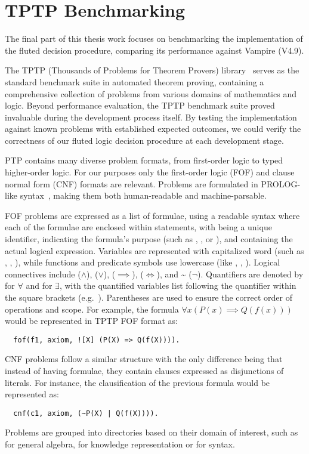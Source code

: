 \chapter{TPTP Benchmarking}\label{chap:tptp-benchmarking}

The final part of this thesis work focuses on benchmarking the implementation of the fluted decision procedure, comparing its performance against Vampire (V4.9).

The TPTP (Thousands of Problems for Theorem Provers) library~\cite{Sut17} serves as the standard benchmark suite in automated theorem proving, containing a comprehensive collection of problems from various domains of mathematics and logic.
Beyond performance evaluation, the TPTP benchmark suite proved invaluable during the development process itself. By testing the implementation against known problems with established expected outcomes, we could verify the correctness of our fluted logic decision procedure at each development stage.

PTP contains many diverse problem formats, from first-order logic to typed higher-order logic. For our purposes only the first-order logic (FOF) and clause normal form (CNF) formats are relevant.
Problems are formulated in PROLOG-like syntax~\cite{Sut22}, making them both human-readable and machine-parsable.

FOF problems are expressed as a list of formulae, using a readable syntax where each of the formulae are enclosed within  statements, with  being a unique identifier,  indicating the formula's purpose (such as , , or ), and  containing the actual logical expression. %
Variables are represented with capitalized word (such as , , ), while functions and predicate symbols use lowercase (like , , ).
Logical connectives include \code{\&} (\(\land\)), \code{|} (\(\lor\)), \code{=>} (\(\implies\)), \code{<=>} (\(\iff\)), and \textasciitilde{} (\(\neg\)).
Quantifiers are denoted by \code{!} for \(\forall\) and  for \(\exists\), with the quantified variables list following the quantifier within the square brackets (e.g.\ \code{[X1,X2]}). %
Parentheses are used to ensure the correct order of operations and scope.
For example, the formula \(\forall x (P(x) \implies Q(f(x)))\) would be represented in TPTP FOF format as:
\begin{verbatim}
  fof(f1, axiom, ![X] (P(X) => Q(f(X)))).
\end{verbatim}
CNF problems follow a similar structure with the only difference being that instead of having formulae, they contain clauses expressed as disjunctions of literals. %
For instance, the clausification of the previous formula would be represented as:
\begin{verbatim}
  cnf(c1, axiom, (~P(X) | Q(f(X)))).
\end{verbatim}
Problems are grouped into directories based on their domain of interest, such as  for general algebra,  for knowledge representation or  for syntax.

